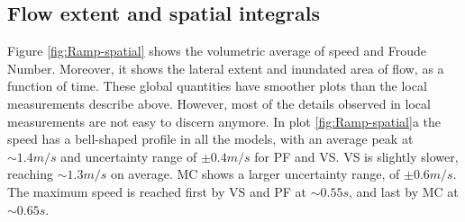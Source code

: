 \documentclass{article}
\begin{document}
\subsection{Flow extent and spatial integrals}
Figure \ref{fig:Ramp-spatial} shows the volumetric average of speed and Froude Number. Moreover, it shows the lateral extent and inundated area of flow, as a function of time. These global quantities have smoother plots than the local measurements describe above. However, most of the details observed in local measurements are not easy to discern anymore. In plot \ref{fig:Ramp-spatial}a the speed has a bell-shaped profile in all the models, with an average peak at $\sim 1.4 m/s$ and uncertainty range of $\pm 0.4 m/s$ for PF and VS. VS is slightly slower, reaching $\sim 1.3 m/s$ on average. MC shows a larger uncertainty range, of $\pm 0.6 m/s$. The maximum speed is reached first by VS and PF at $\sim 0.55 s$, and last by MC at $\sim 0.65 s$.
\end{document}
